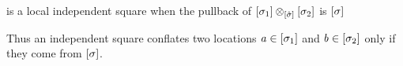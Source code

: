\begin{definition}
    is a local independent square when the pullback of $[\sigma_1] \otimes_{[\hat\sigma]} [\sigma_2]$ is $[\sigma]$
    \begin{center}
    \end{center}
    Thus an independent square conflates two locations $\mathit{a} \in [\sigma_1]$ and $\mathit{b} \in [\sigma_2]$ only if they come from $[\sigma]$.
\end{definition}

